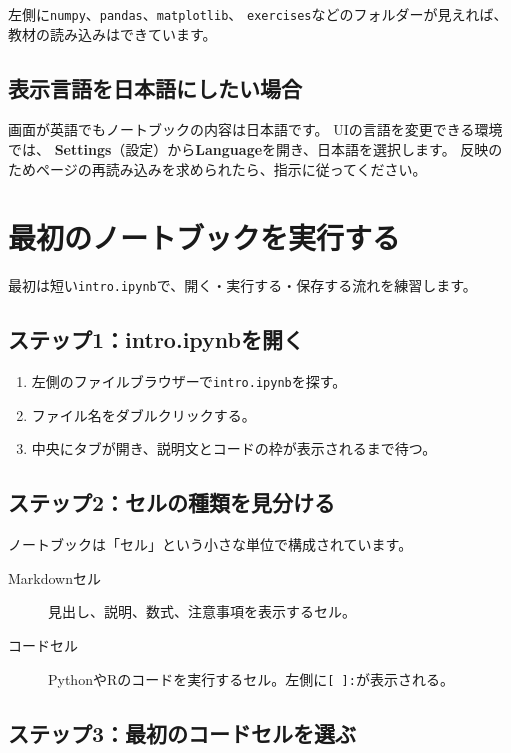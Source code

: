 \documentclass[a4paper,11pt]{ltjsarticle}
\newcommand{\menu}[1]{\textsf{\bfseries #1}}
\newcommand{\filepath}[1]{\nolinkurl{#1}}
\begin{document}
\begin{successbox}
左側に\filepath{numpy}、\filepath{pandas}、\filepath{matplotlib}、
\filepath{exercises}などのフォルダーが見えれば、教材の読み込みはできています。
\end{successbox}

\subsection{表示言語を日本語にしたい場合}

画面が英語でもノートブックの内容は日本語です。
UIの言語を変更できる環境では、
\menu{Settings}（設定）から\menu{Language}を開き、日本語を選択します。
反映のためページの再読み込みを求められたら、指示に従ってください。

\section{最初のノートブックを実行する}

最初は短い\filepath{intro.ipynb}で、開く・実行する・保存する流れを練習します。

\subsection{ステップ1：intro.ipynbを開く}

\begin{enumerate}
  \item 左側のファイルブラウザーで\filepath{intro.ipynb}を探す。
  \item ファイル名をダブルクリックする。
  \item 中央にタブが開き、説明文とコードの枠が表示されるまで待つ。
\end{enumerate}

\subsection{ステップ2：セルの種類を見分ける}

ノートブックは「セル」という小さな単位で構成されています。

\begin{description}
  \item[Markdownセル] 見出し、説明、数式、注意事項を表示するセル。
  \item[コードセル] PythonやRのコードを実行するセル。左側に\texttt{[ ]:}が表示される。
\end{description}

\subsection{ステップ3：最初のコードセルを選ぶ}
\end{document}
